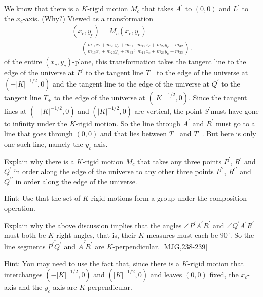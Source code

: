 \documentclass{ximera}
\begin{document}
We know that there is a $K$-rigid motion $M_{c}$ that takes $A^{\prime}$ to
$\left(  0,0\right)  $ and $L^{\prime}$ to the $x_{c}$-axis. (Why?) Viewed as
a transformation
\begin{gather*}
\left(  \underline{x_{c}},\underline{y_{c}}\right)  =M_{c}\left(  x_{c}%
,y_{c}\right) \\
=\left(  \frac{m_{11}x_{c}+m_{21}y_{c}+m_{31}}{m_{13}x_{c}+m_{23}y_{c}+m_{33}%
},\frac{m_{12}x_{c}+m_{22}y_{c}+m_{32}}{m_{13}x_{c}+m_{23}y_{c}+m_{33}%
}\right)  .
\end{gather*}
of the entire $\left(  x_{c},y_{c}\right)  $-plane, this transformation takes
the tangent line to the edge of the universe at $P^{\prime}$ to the tangent
line $T_{-}$ to the edge of the universe at $\left(  -\left\vert K\right\vert
^{-1/2},0\right)  $ and the tangent line to the edge of the universe at
$Q^{\prime}$ to the tangent line $T_{+}$ to the edge of the universe at
$\left(  \left\vert K\right\vert ^{-1/2},0\right)  $. Since the tangent lines
at $\left(  -\left\vert K\right\vert ^{-1/2},0\right)  $ and $\left(
\left\vert K\right\vert ^{-1/2},0\right)  $ are vertical, the point
$S^{\prime}$must have gone to infinity under the $K$-rigid motion. So the line
through $A^{\prime}$ and $R^{\prime}$ must go to a line that goes through
$\left(  0,0\right)  $ and that lies between $T_{-}$ and $T_{+}$. But here is
only one such line, namely the $y_{c}$-axis.

\begin{exercise}
\label{99}Explain why there is a $K$-rigid motion $M_{c}$ that takes any three
points $P^{\prime}$, $R^{\prime}$ and $Q^{\prime}$ in order along the edge of
the universe to any other three points $P^{\prime\prime}$, $R^{\prime\prime}$
and $Q^{\prime\prime}$ in order along the edge of the universe.

Hint: Use that the set of $K$-rigid motions form a group under the composition operation.
\end{exercise}

\begin{exercise}
 Explain why the above discussion implies that the angles $\angle
P^{\prime}A^{\prime}R^{\prime}$ and $\angle Q^{\prime}A^{\prime}R^{\prime}$
must both be $K$-right angles, that is, their $K$-measures must each be
$90^{\circ}$. So the line segments $\overline{P^{\prime}Q^{\prime}}$ and
$\overline{A^{\prime}R^{\prime}}$ are $K$-perpendicular. [MJG,238-239]

Hint: You may need to use the fact that, since there is a $K$-rigid motion
that interchanges $\left(  -\left\vert K\right\vert ^{-1/2},0\right)  $ and
$\left(  \left\vert K\right\vert ^{-1/2},0\right)  $ and leaves $\left(
0,0\right)  $ fixed, the $x_{c}$-axis and the $y_{c}$-axis are $K$-perpendicular.
\end{exercise}
\end{document}
